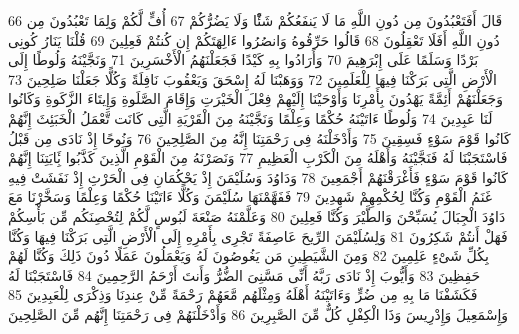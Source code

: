 \documentclass[20pt,a4paper]{article}
\begin{document}
{\tiny\colorbox{cl_aya}{66}} قَالَ أَفَتَعْبُدُونَ مِن دُونِ اللَّهِ مَا لَا يَنفَعُكُمْ شَئًْا وَلَا يَضُرُّكُمْ
{\tiny\colorbox{cl_aya}{67}} أُفٍّ لَّكُمْ وَلِمَا تَعْبُدُونَ مِن دُونِ اللَّهِ أَفَلَا تَعْقِلُونَ
{\tiny\colorbox{cl_aya}{68}} قَالُوا حَرِّقُوهُ وَانصُرُوا ءَالِهَتَكُمْ إِن كُنتُمْ فَعِلِينَ
{\tiny\colorbox{cl_aya}{69}} قُلْنَا يَنَارُ كُونِى بَرْدًا وَسَلَمًا عَلَى إِبْرَهِيمَ
{\tiny\colorbox{cl_aya}{70}} وَأَرَادُوا بِهِ كَيْدًا فَجَعَلْنَهُمُ الْأَخْسَرِينَ
{\tiny\colorbox{cl_aya}{71}} وَنَجَّيْنَهُ وَلُوطًا إِلَى الْأَرْضِ الَّتِى بَرَكْنَا فِيهَا لِلْعَلَمِينَ
{\tiny\colorbox{cl_aya}{72}} وَوَهَبْنَا لَهُ إِسْحَقَ وَيَعْقُوبَ نَافِلَةً وَكُلًّا جَعَلْنَا صَلِحِينَ
{\tiny\colorbox{cl_aya}{73}} وَجَعَلْنَهُمْ أَئِمَّةً يَهْدُونَ بِأَمْرِنَا وَأَوْحَيْنَا إِلَيْهِمْ فِعْلَ الْخَيْرَتِ وَإِقَامَ الصَّلَوةِ وَإِيتَاءَ الزَّكَوةِ وَكَانُوا لَنَا عَبِدِينَ
{\tiny\colorbox{cl_aya}{74}} وَلُوطًا ءَاتَيْنَهُ حُكْمًا وَعِلْمًا وَنَجَّيْنَهُ مِنَ الْقَرْيَةِ الَّتِى كَانَت تَّعْمَلُ الْخَبَئِثَ إِنَّهُمْ كَانُوا قَوْمَ سَوْءٍ فَسِقِينَ
{\tiny\colorbox{cl_aya}{75}} وَأَدْخَلْنَهُ فِى رَحْمَتِنَا إِنَّهُ مِنَ الصَّلِحِينَ
{\tiny\colorbox{cl_aya}{76}} وَنُوحًا إِذْ نَادَى مِن قَبْلُ فَاسْتَجَبْنَا لَهُ فَنَجَّيْنَهُ وَأَهْلَهُ مِنَ الْكَرْبِ الْعَظِيمِ
{\tiny\colorbox{cl_aya}{77}} وَنَصَرْنَهُ مِنَ الْقَوْمِ الَّذِينَ كَذَّبُوا بَِٔايَتِنَا إِنَّهُمْ كَانُوا قَوْمَ سَوْءٍ فَأَغْرَقْنَهُمْ أَجْمَعِينَ
{\tiny\colorbox{cl_aya}{78}} وَدَاوُدَ وَسُلَيْمَنَ إِذْ يَحْكُمَانِ فِى الْحَرْثِ إِذْ نَفَشَتْ فِيهِ غَنَمُ الْقَوْمِ وَكُنَّا لِحُكْمِهِمْ شَهِدِينَ
{\tiny\colorbox{cl_aya}{79}} فَفَهَّمْنَهَا سُلَيْمَنَ وَكُلًّا ءَاتَيْنَا حُكْمًا وَعِلْمًا وَسَخَّرْنَا مَعَ دَاوُدَ الْجِبَالَ يُسَبِّحْنَ وَالطَّيْرَ وَكُنَّا فَعِلِينَ
{\tiny\colorbox{cl_aya}{80}} وَعَلَّمْنَهُ صَنْعَةَ لَبُوسٍ لَّكُمْ لِتُحْصِنَكُم مِّن بَأْسِكُمْ فَهَلْ أَنتُمْ شَكِرُونَ
{\tiny\colorbox{cl_aya}{81}} وَلِسُلَيْمَنَ الرِّيحَ عَاصِفَةً تَجْرِى بِأَمْرِهِ إِلَى الْأَرْضِ الَّتِى بَرَكْنَا فِيهَا وَكُنَّا بِكُلِّ شَىْءٍ عَلِمِينَ
{\tiny\colorbox{cl_aya}{82}} وَمِنَ الشَّيَطِينِ مَن يَغُوصُونَ لَهُ وَيَعْمَلُونَ عَمَلًا دُونَ ذَلِكَ وَكُنَّا لَهُمْ حَفِظِينَ
{\tiny\colorbox{cl_aya}{83}} وَأَيُّوبَ إِذْ نَادَى رَبَّهُ أَنِّى مَسَّنِىَ الضُّرُّ وَأَنتَ أَرْحَمُ الرَّحِمِينَ
{\tiny\colorbox{cl_aya}{84}} فَاسْتَجَبْنَا لَهُ فَكَشَفْنَا مَا بِهِ مِن ضُرٍّ وَءَاتَيْنَهُ أَهْلَهُ وَمِثْلَهُم مَّعَهُمْ رَحْمَةً مِّنْ عِندِنَا وَذِكْرَى لِلْعَبِدِينَ
{\tiny\colorbox{cl_aya}{85}} وَإِسْمَعِيلَ وَإِدْرِيسَ وَذَا الْكِفْلِ كُلٌّ مِّنَ الصَّبِرِينَ
{\tiny\colorbox{cl_aya}{86}} وَأَدْخَلْنَهُمْ فِى رَحْمَتِنَا إِنَّهُم مِّنَ الصَّلِحِينَ
\end{document}
